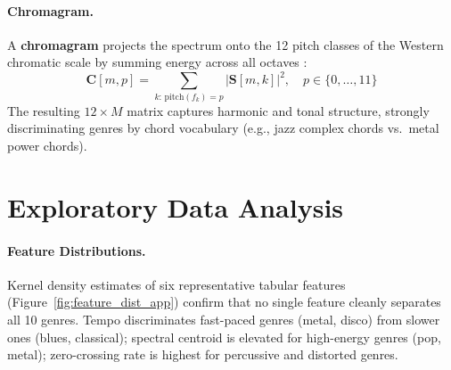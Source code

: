 \documentclass[10pt, twocolumn, a4paper]{article}
\begin{document}
\paragraph{Chromagram.}
A \textbf{chromagram} projects the spectrum onto the 12 pitch classes of the Western chromatic scale by summing energy across all octaves \cite{muller2015}:
\[
    \mathbf{C}[m, p] = \sum_{k:\, \text{pitch}(f_k) = p} |\mathbf{S}[m, k]|^2, \quad p \in \{0, \ldots, 11\}
\]
The resulting $12 \times M$ matrix captures harmonic and tonal structure, strongly discriminating genres by chord vocabulary (e.g., jazz complex chords vs.\ metal power chords).

\begin{table}[H]
\centering
\caption{Summary of the three CNN input representations.}
\end{table}

\section{Exploratory Data Analysis}
\label{app:eda}

\paragraph{Feature Distributions.}
Kernel density estimates of six representative tabular features (Figure~\ref{fig:feature_dist_app}) confirm that no single feature cleanly separates all 10 genres. Tempo discriminates fast-paced genres (metal, disco) from slower ones (blues, classical); spectral centroid is elevated for high-energy genres (pop, metal); zero-crossing rate is highest for percussive and distorted genres.
\end{document}
